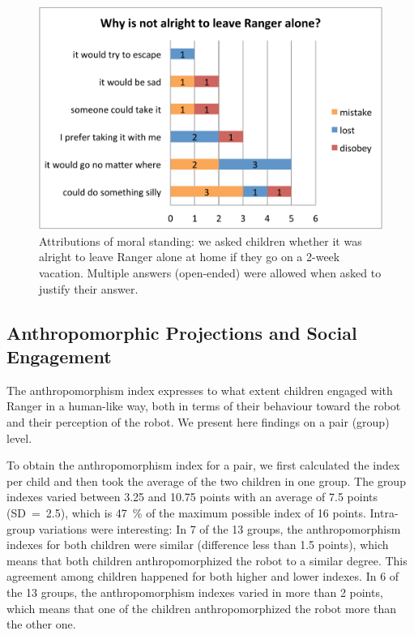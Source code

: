 \documentclass{sig-alternate}
\begin{document}
\begin{figure}[!h]
    \centering 
    \includegraphics[width=1.0\linewidth]{domino-leave-why.pdf}
    \caption{\small Attributions of moral
        standing: we asked children whether it was alright to leave Ranger
        alone at home if they go on a 2-week vacation. Multiple answers
        (open-ended) were allowed when asked to justify their answer.}

    \label{fig:domino-leave-alone} 
\end{figure}

\subsection{Anthropomorphic Projections and Social Engagement}

The anthropomorphism index expresses to what extent children engaged with Ranger
in a human-like way, both in terms of their behaviour toward the robot and their
perception of the robot. We present here findings on a pair (group) level.

To obtain the anthropomorphism index for a pair, we first calculated the index
per child and then took the average of the two children in one group.  The group
indexes varied between 3.25 and 10.75 points with an average of 7.5 points
(SD~=~2.5), which is 47~\% of the maximum possible index of 16 points.
Intra-group variations were interesting: In 7 of the 13 groups, the
anthropomorphism indexes for both children were similar (difference less than
1.5 points), which means that both children anthropomorphized the robot to a
similar degree. This agreement among children happened for both higher and lower
indexes. In 6 of the 13 groups, the anthropomorphism indexes varied in more than
2 points, which means that one of the children anthropomorphized the robot more
than the other one.
\end{document}
